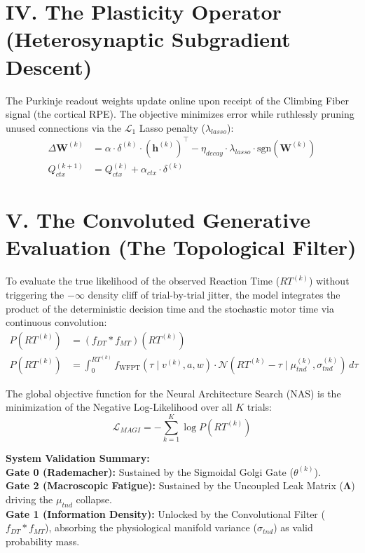 \documentclass[11pt, a4paper]{article}
\begin{document}
\section{IV. The Plasticity Operator (Heterosynaptic Subgradient Descent)}
The Purkinje readout weights update online upon receipt of the Climbing Fiber signal (the cortical RPE). The objective minimizes error while ruthlessly pruning unused connections via the $\mathcal{L}_1$ Lasso penalty ($\lambda_{lasso}$):
\begin{align}
\Delta \mathbf{W}^{(k)} &= \alpha \cdot \delta^{(k)} \cdot \left(\mathbf{h}^{(k)}\right)^\top - \eta_{decay} \cdot \lambda_{lasso} \cdot \text{sgn}\left(\mathbf{W}^{(k)}\right) \\
Q_{ctx}^{(k+1)} &= Q_{ctx}^{(k)} + \alpha_{ctx} \cdot \delta^{(k)}
\end{align}

\section{V. The Convoluted Generative Evaluation (The Topological Filter)}
To evaluate the true likelihood of the observed Reaction Time ($RT^{(k)}$) without triggering the $-\infty$ density cliff of trial-by-trial jitter, the model integrates the product of the deterministic decision time and the stochastic motor time via continuous convolution:
\begin{align}
P(RT^{(k)}) &= (f_{DT} * f_{MT})(RT^{(k)}) \\
P(RT^{(k)}) &= \int_{0}^{RT^{(k)}} f_{\text{WFPT}}(\tau \mid v^{(k)}, a, w) \cdot \mathcal{N}\left(RT^{(k)} - \tau \mid \mu_{tnd}^{(k)}, \sigma_{tnd}^{(k)}\right) \, d\tau
\end{align}

The global objective function for the Neural Architecture Search (NAS) is the minimization of the Negative Log-Likelihood over all $K$ trials:
\begin{equation}
\mathcal{L}_{MAGI} = - \sum_{k=1}^K \log P(RT^{(k)})
\end{equation}

\vspace{1cm}
\noindent\textbf{System Validation Summary:} \\
\textbf{Gate 0 (Rademacher):} Sustained by the Sigmoidal Golgi Gate ($\theta^{(k)}$). \\
\textbf{Gate 2 (Macroscopic Fatigue):} Sustained by the Uncoupled Leak Matrix ($\mathbf{\Lambda}$) driving the $\mu_{tnd}$ collapse. \\
\textbf{Gate 1 (Information Density):} Unlocked by the Convolutional Filter ($f_{DT} * f_{MT}$), absorbing the physiological manifold variance ($\sigma_{tnd}$) as valid probability mass.
\end{document}

